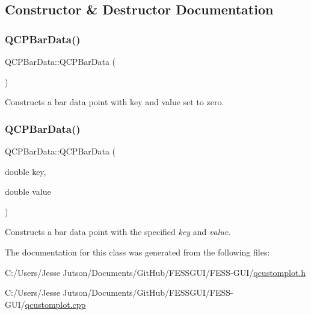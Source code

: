 \subsection{Constructor \& Destructor Documentation}
\hypertarget{class_q_c_p_bar_data_a8d214eda9ef41bc6da2a908a09623836}{}\label{class_q_c_p_bar_data_a8d214eda9ef41bc6da2a908a09623836} 
\subsubsection{\texorpdfstring{Q\+C\+P\+Bar\+Data()}{QCPBarData()}\hspace{0.1cm}{\footnotesize\ttfamily [1/2]}}
{\footnotesize\ttfamily Q\+C\+P\+Bar\+Data\+::\+Q\+C\+P\+Bar\+Data (\begin{DoxyParamCaption}{ }\end{DoxyParamCaption})}

Constructs a bar data point with key and value set to zero. \hypertarget{class_q_c_p_bar_data_ac0bb7ede5373a7b18713418fa78f972d}{}\label{class_q_c_p_bar_data_ac0bb7ede5373a7b18713418fa78f972d} 
\subsubsection{\texorpdfstring{Q\+C\+P\+Bar\+Data()}{QCPBarData()}\hspace{0.1cm}{\footnotesize\ttfamily [2/2]}}
{\footnotesize\ttfamily Q\+C\+P\+Bar\+Data\+::\+Q\+C\+P\+Bar\+Data (\begin{DoxyParamCaption}\item[{double}]{key,  }\item[{double}]{value }\end{DoxyParamCaption})}

Constructs a bar data point with the specified {\itshape key} and {\itshape value}. 

The documentation for this class was generated from the following files\+:\begin{DoxyCompactItemize}
\item 
C\+:/\+Users/\+Jesse Jutson/\+Documents/\+Git\+Hub/\+F\+E\+S\+S\+G\+U\+I/\+F\+E\+S\+S-\/\+G\+U\+I/\hyperlink{qcustomplot_8h}{qcustomplot.\+h}\item 
C\+:/\+Users/\+Jesse Jutson/\+Documents/\+Git\+Hub/\+F\+E\+S\+S\+G\+U\+I/\+F\+E\+S\+S-\/\+G\+U\+I/\hyperlink{qcustomplot_8cpp}{qcustomplot.\+cpp}\end{DoxyCompactItemize}
